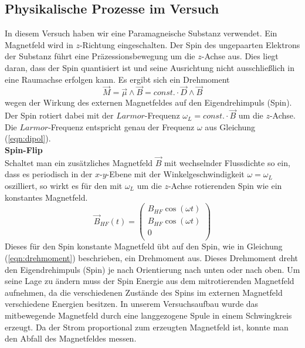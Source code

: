 \documentclass[a4paper,10pt]{scrartcl} %
\begin{document}
\subsection{Physikalische Prozesse im Versuch}
\label{subsec:prozesse}
In diesem Versuch haben wir eine Paramagneische Substanz verwendet. Ein Magnetfeld wird in $z$-Richtung eingeschalten. Der Spin des ungepaarten Elektrons der Substanz führt eine Präzessionsbewegung um die $z$-Achse aus. Dies liegt daran, dass der Spin quantisiert ist und seine Ausrichtung nicht ausschließlich in eine Raumachse erfolgen kann. Es ergibt sich ein Drehmoment
\begin{equation}
\label{eqn:drehmoment}
\vec{M} = \vec{\mu} \wedge \vec{B} = const. \cdot \vec{D} \wedge \vec{B}
\end{equation}
wegen der Wirkung des externen Magnetfeldes auf den Eigendrehimpuls (Spin). Der Spin rotiert dabei mit der $Larmor$-Frequenz $\omega _L = const. \cdot \vec B$ um die $z$-Achse. Die $Larmor$-Frequenz entspricht genau der Frequenz $\omega$ aus Gleichung (\ref{eqn:dipol}).\\
\textbf{Spin-Flip}\\
Schaltet man ein zusätzliches Magnetfeld $\vec{B}$ mit wechselnder Flussdichte so ein, dass es periodisch in der $x$-$y$-Ebene mit der Winkelgeschwindigkeit $\omega = \omega _L$ oszilliert, so wirkt es für den mit $\omega _L$ um die $z$-Achse rotierenden Spin wie ein konstantes Magnetfeld.
\begin{equation}
\label{eqn:hochfrequenz Magnetfeld}
\vec{B}_{HF}(t) = \left( \begin{array}{c}
B_{HF} \cos( \omega t)\\
B_{HF} \cos( \omega t)\\
0\\
\end{array} \right)
\end{equation}
Dieses für den Spin konstante Magnetfeld übt auf den Spin, wie in Gleichung (\ref{eqn:drehmoment}) beschrieben, ein Drehmoment aus. Dieses Drehmoment dreht den Eigendrehimpuls (Spin) je nach Orientierung nach unten oder nach oben. Um seine Lage zu ändern muss der Spin Energie aus dem mitrotierenden Magnetfeld aufnehmen, da die verschiedenen Zustände des Spins im externen Magnetfeld verschiedene Energien besitzen. In unserem Versuchsaufbau wurde das mitbewegende Magnetfeld durch eine langgezogene Spule in einem Schwingkreis erzeugt. Da der Strom proportional zum erzeugten Magnetfeld ist, konnte man den Abfall des Magnetfeldes messen.
\end{document}
